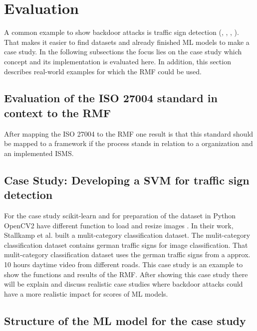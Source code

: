 \section{Evaluation}
\label{sec:evaluation}

A common example to show backdoor attacks is traffic sign detection (\cite{DBLP:journals/corr/abs-2102-10369}, \cite{DBLP:journals/corr/abs-1708-06733}, \cite{DBLP:conf/codaspy/NudingM20}, \cite{DBLP:journals/tdsc/LiXZZZ21}). That makes it easier to find datasets and already finished ML models to make a case study. In the following subsections the focus lies on the case study which concept and its implementation is evaluated here. In addition, this section describes real-world examples for which the RMF could be used.

\subsection{Evaluation of the ISO 27004 standard in context to the RMF}

After mapping the ISO 27004 to the RMF one result is that this standard should be mapped to a framework if the process stands in relation to a organization and an implemented ISMS.

\subsection{Case Study: Developing a SVM for traffic sign detection}

For the case study scikit-learn \cite{scikit-learn} and for preparation of the dataset in Python OpenCV2 have different function to load and resize images \cite{opencv_library}. In their work, Stallkamp et al. \cite{DBLP:conf/ijcnn/StallkampSSI11} built a mulit-category classification dataset. The mulit-category classification dataset contains german traffic signs for image classification. That mulit-category classification dataset uses the german traffic signs from a approx. 10 hours daytime video from different roads.
This case study is an example to show the functions and results of the RMF. After showing this case study there will be explain and discuss realistic case studies where backdoor attacks could have a more realistic impact for scores of ML models.

\subsection{Structure of the ML model for the case study}

